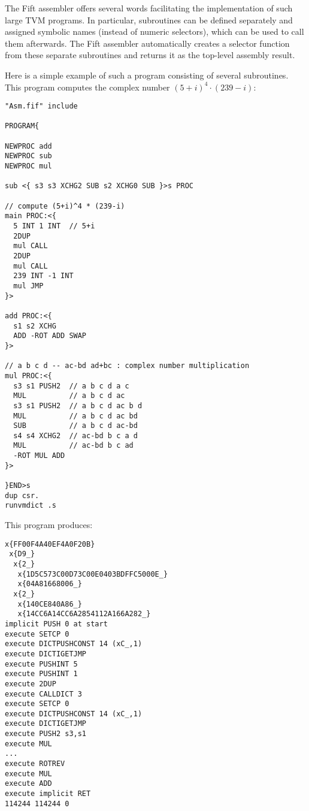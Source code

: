 \documentclass[12pt,oneside]{article}
\begin{document}
The Fift assembler offers several words facilitating the implementation of such large TVM programs. In particular, subroutines can be defined separately and assigned symbolic names (instead of numeric selectors), which can be used to call them afterwards. The Fift assembler automatically creates a selector function from these separate subroutines and returns it as the top-level assembly result.

Here is a simple example of such a program consisting of several subroutines. This program computes the complex number $(5+i)^4\cdot(239-i)$:
\begin{verbatim}
"Asm.fif" include

PROGRAM{

NEWPROC add
NEWPROC sub
NEWPROC mul

sub <{ s3 s3 XCHG2 SUB s2 XCHG0 SUB }>s PROC

// compute (5+i)^4 * (239-i)
main PROC:<{
  5 INT 1 INT  // 5+i
  2DUP
  mul CALL
  2DUP
  mul CALL
  239 INT -1 INT
  mul JMP
}>

add PROC:<{
  s1 s2 XCHG
  ADD -ROT ADD SWAP
}>

// a b c d -- ac-bd ad+bc : complex number multiplication
mul PROC:<{
  s3 s1 PUSH2  // a b c d a c
  MUL          // a b c d ac
  s3 s1 PUSH2  // a b c d ac b d
  MUL          // a b c d ac bd
  SUB          // a b c d ac-bd
  s4 s4 XCHG2  // ac-bd b c a d
  MUL          // ac-bd b c ad
  -ROT MUL ADD
}>

}END>s
dup csr.
runvmdict .s
\end{verbatim}
This program produces:
\begin{verbatim}
x{FF00F4A40EF4A0F20B}
 x{D9_}
  x{2_}
   x{1D5C573C00D73C00E0403BDFFC5000E_}
   x{04A81668006_}
  x{2_}
   x{140CE840A86_}
   x{14CC6A14CC6A2854112A166A282_}
implicit PUSH 0 at start
execute SETCP 0
execute DICTPUSHCONST 14 (xC_,1)
execute DICTIGETJMP
execute PUSHINT 5
execute PUSHINT 1
execute 2DUP
execute CALLDICT 3
execute SETCP 0
execute DICTPUSHCONST 14 (xC_,1)
execute DICTIGETJMP
execute PUSH2 s3,s1
execute MUL
...
execute ROTREV
execute MUL
execute ADD
execute implicit RET
114244 114244 0
\end{verbatim}
\end{document}
